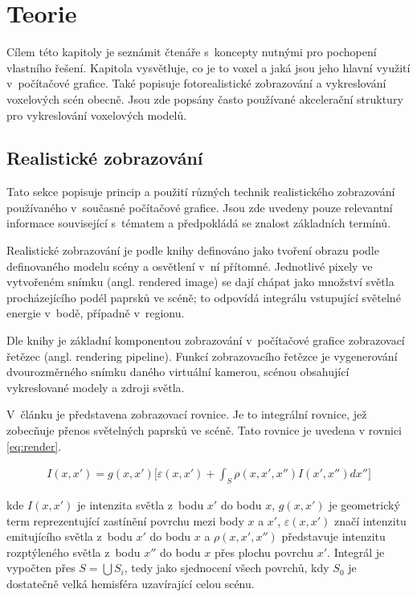 \chapter{Teorie}
\label{teorie}
Cílem této kapitoly je seznámit čtenáře s~koncepty nutnými pro pochopení vlastního řešení. Kapitola vysvětluje, co je to voxel a jaká jsou jeho hlavní využití v~počítačové grafice. Také popisuje fotorealistické zobrazování a vykreslování voxelových scén obecně. Jsou zde popsány často používané akcelerační struktury pro vykreslování voxelových modelů.

\section{Realistické zobrazování}
Tato sekce popisuje princip a použití různých technik realistického zobrazování používaného v~současné počítačové grafice. Jsou zde uvedeny pouze relevantní informace související s~tématem a předpokládá se znalost základních termínů.

Realistické zobrazování je podle knihy \cite{gfx_principles_practice} definováno jako tvoření obrazu podle definovaného modelu scény a osvětlení v~ní přítomné. Jednotlivé pixely ve vytvořeném snímku (angl. rendered image) se dají chápat jako množství světla procházejícího podél paprsků ve scéně; to odpovídá integrálu vstupující světelné energie v~bodě, případně v~regionu.

Dle knihy \cite{real_time_render} je základní komponentou zobrazování v~počítačové grafice zobrazovací řetězec (angl. rendering pipeline). Funkcí zobrazovacího řetězce je vygenerování dvourozměrného snímku daného virtuální kamerou, scénou obsahující vykreslované modely a zdroji světla.

V~článku \cite{render_eq} je představena zobrazovací rovnice. Je to integrální rovnice, jež zobecňuje přenos světelných paprsků ve scéně. Tato rovnice je uvedena v rovnici \ref{eq:render}.

\begin{equation} \label{eq:render}
	\begin{gathered}
		I(x, x') = g(x, x') \Big[\varepsilon(x, x') + \int_S\rho(x, x', x'')I(x', x'')dx''\Big]
	\end{gathered}
\end{equation}

kde $I(x, x')$ je intenzita světla z~bodu $x'$ do bodu $x$, $g(x, x')$ je geometrický term reprezentující zastínění povrchu mezi body $x$ a $x'$, $\varepsilon(x, x')$ značí intenzitu emitujícího světla z~bodu $x'$ do bodu $x$ a $\rho(x, x', x'')$ představuje intenzitu rozptýleného světla z~bodu $x''$ do bodu $x$ přes plochu povrchu $x'$. Integrál je vypočten přes $S = \bigcup S_i$, tedy jako sjednocení všech povrchů, kdy $S_0$ je dostatečně velká hemisféra uzavírající celou scénu.

